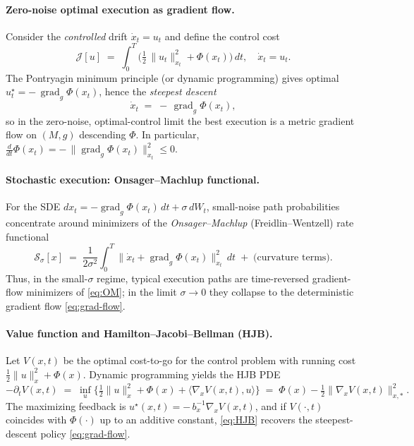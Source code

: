 \documentclass[12pt,a4paper]{article}
\theoremstyle{plain}
\theoremstyle{definition}
\theoremstyle{remark}
\newcommand{\Phifield}{\Phi}
\begin{document}
\paragraph{Zero-noise optimal execution as gradient flow.}
Consider the \emph{controlled} drift $\dot x_t = u_t$ and define the control cost
\[
\mathcal{J}[u]\;=\;\int_{0}^{T}\!\Big(\tfrac{1}{2}\,\|u_t\|_{x_t}^{2}+\Phifield(x_t)\Big)\,dt, \quad \dot x_t=u_t.
\]
The Pontryagin minimum principle (or dynamic programming) gives optimal $u_t^{\star}=-\,\operatorname{grad}_{g}\Phifield(x_t)$, hence the \emph{steepest descent}
\begin{equation}\label{eq:grad-flow}
\dot x_t \;=\; -\,\operatorname{grad}_{g}\Phifield(x_t),
\end{equation}
so in the zero-noise, optimal-control limit the best execution is a metric gradient flow on $(M,g)$ descending $\Phifield$. In particular, $\frac{d}{dt}\Phifield(x_t)= -\,\|\operatorname{grad}_{g}\Phifield(x_t)\|_{x_t}^{2}\le 0$.

\paragraph{Stochastic execution: Onsager--Machlup functional.}
For the SDE $dx_t = -\operatorname{grad}_{g}\Phifield(x_t)\,dt + \sigma\,dW_t$, small-noise path probabilities concentrate around minimizers of the \emph{Onsager--Machlup} (Freidlin--Wentzell) rate functional
\begin{equation}\label{eq:OM}
\mathcal{S}_{\sigma}[x] \;=\; \frac{1}{2\sigma^{2}} \int_{0}^{T}\!\big\|\dot x_t + \operatorname{grad}_{g}\Phifield(x_t)\big\|_{x_t}^{2}\,dt \;+\; \text{(curvature terms)}.
\end{equation}
Thus, in the small-$\sigma$ regime, typical execution paths are time-reversed gradient-flow minimizers of \eqref{eq:OM}; in the limit $\sigma\!\to\!0$ they collapse to the deterministic gradient flow \eqref{eq:grad-flow}.

\paragraph{Value function and Hamilton--Jacobi--Bellman (HJB).}
Let $V(x,t)$ be the optimal cost-to-go for the control problem with running cost $\tfrac{1}{2}\|u\|_{x}^{2}+\Phifield(x)$. Dynamic programming yields the HJB PDE
\begin{equation}\label{eq:HJB}
-\partial_t V(x,t) \;=\; \inf_{u}\Big\{\tfrac{1}{2}\|u\|_{x}^{2}+\Phifield(x) + \langle \nabla_x V(x,t), u\rangle\Big\} \;=\; \Phifield(x) - \tfrac{1}{2}\|\nabla_x V(x,t)\|_{x,*}^{2}.
\end{equation}
The maximizing feedback is $u^{\star}(x,t)=-\,b_x^{-1}\nabla_x V(x,t)$, and if $V(\cdot,t)$ coincides with $\Phifield(\cdot)$ up to an additive constant, \eqref{eq:HJB} recovers the steepest-descent policy \eqref{eq:grad-flow}.
\end{document}
